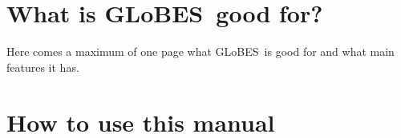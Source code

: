 \documentclass[a4paper,12pt,twoside]{book}
\newcommand{\GLOBES}{{\sf GLoBES}}
\begin{document}
\clearpage
\thispagestyle{empty}

\cleardoublepage
\setcounter{page}{1}

\chapter*{What is \GLOBES\ good for?}

Here comes a maximum of one page what \GLOBES\ is good for and what main features it has.
\cleardoublepage
\tableofcontents

\cleardoublepage
\setcounter{page}{1}

\chapter*{How to use this manual}



















\printindex
\end{document}
